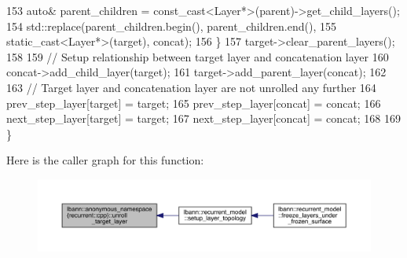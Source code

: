 \begin{DoxyCode}
153     \textcolor{keyword}{auto}& parent\_children = \textcolor{keyword}{const\_cast<}Layer*\textcolor{keyword}{>}(parent)->get\_child\_layers();
154     std::replace(parent\_children.begin(), parent\_children.end(),
155                  \textcolor{keyword}{static\_cast<}Layer*\textcolor{keyword}{>}(target), concat);
156   \}
157   target->clear\_parent\_layers();
158 
159   \textcolor{comment}{// Setup relationship between target layer and concatenation layer}
160   concat->add\_child\_layer(target);
161   target->add\_parent\_layer(concat);
162 
163   \textcolor{comment}{// Target layer and concatenation layer are not unrolled any further}
164   prev\_step\_layer[target] = target;
165   prev\_step\_layer[concat] = concat;
166   next\_step\_layer[target] = target;
167   next\_step\_layer[concat] = concat;
168 
169 \}
\end{DoxyCode}
Here is the caller graph for this function\+:\nopagebreak
\begin{figure}[H]
\begin{center}
\leavevmode
\includegraphics[width=350pt]{namespacelbann_1_1anonymous__namespace_02recurrent_8cpp_03_af04adecd9a62fdcd16ae78b3e95d4bb5_icgraph}
\end{center}
\end{figure}
